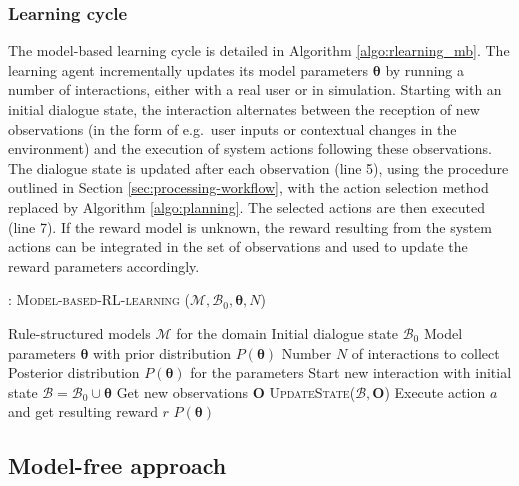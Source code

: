  
\subsubsection*{Learning cycle}

The model-based learning cycle is detailed in Algorithm \ref{algo:rlearning_mb}. The learning agent incrementally updates its model parameters $\boldsymbol\theta$  by running a number of interactions, either with a real user or in simulation. Starting with an initial dialogue state, the interaction alternates between the reception of new observations (in the form of e.g.\ user inputs or contextual changes in the environment) and the execution of system actions following these observations.  The dialogue state is updated after each observation (line 5), using the procedure outlined in Section \ref{sec:processing-workflow}, with the action selection method replaced by Algorithm \ref{algo:planning}. The selected actions are then executed (line 7).   If the reward model is unknown, the reward resulting from the system actions can be integrated in the set of observations and used to update the reward parameters accordingly. 

\begin{algorithm}[h]
\caption{: \textsc{Model-based-RL-learning} ($\mathcal{M}, \mathcal{B}_0, \boldsymbol\theta, N$)}
\begin{algorithmic}[1]\vspace{1mm}
\REQUIRE Rule-structured models $\mathcal{M}$ for the domain
\REQUIRE Initial dialogue state $\mathcal{B}_0$
\REQUIRE Model parameters $\boldsymbol\theta$ with prior distribution $P(\boldsymbol\theta)$
\REQUIRE Number $N$ of interactions to collect
\ENSURE Posterior distribution $P(\boldsymbol\theta)$ for the parameters  \vspace{1mm}
\STATE Start new interaction with initial state $\mathcal{B} = \mathcal{B}_0 \cup \boldsymbol\theta $
\STATE Get new observations $\mathbf{O}$
\STATE \textsc{UpdateState}($\mathcal{B}, \mathbf{O}$)
\STATE Execute action $a$ and get resulting reward $r$
\ENDIF
\ENDWHILE
\ENDFOR
\RETURN $P(\boldsymbol\theta)$
\end{algorithmic} 
\label{algo:rlearning_mb}
\end{algorithm}



\subsection{Model-free approach}
\label{sec:modelfree}

